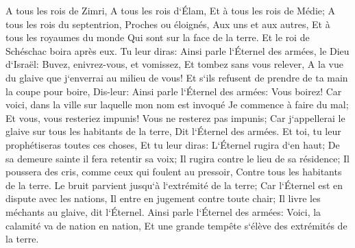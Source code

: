 \verse A tous les rois de Zimri, A tous les rois d`Élam, Et à tous les rois de Médie; 
\verse A tous les rois du septentrion, Proches ou éloignés, Aux uns et aux autres, Et à tous les royaumes du monde Qui sont sur la face de la terre. Et le roi de Schéschac boira après eux. 
\verse Tu leur diras: Ainsi parle l`Éternel des armées, le Dieu d`Israël: Buvez, enivrez-vous, et vomissez, Et tombez sans vous relever, A la vue du glaive que j`enverrai au milieu de vous! 
\verse Et s`ils refusent de prendre de ta main la coupe pour boire, Dis-leur: Ainsi parle l`Éternel des armées: Vous boirez! 
\verse Car voici, dans la ville sur laquelle mon nom est invoqué Je commence à faire du mal; Et vous, vous resteriez impunis! Vous ne resterez pas impunis; Car j`appellerai le glaive sur tous les habitants de la terre, Dit l`Éternel des armées. 
\verse Et toi, tu leur prophétiseras toutes ces choses, Et tu leur diras: L`Éternel rugira d`en haut; De sa demeure sainte il fera retentir sa voix; Il rugira contre le lieu de sa résidence; Il poussera des cris, comme ceux qui foulent au pressoir, Contre tous les habitants de la terre. 
\verse Le bruit parvient jusqu`à l`extrémité de la terre; Car l`Éternel est en dispute avec les nations, Il entre en jugement contre toute chair; Il livre les méchants au glaive, dit l`Éternel. 
\verse Ainsi parle l`Éternel des armées: Voici, la calamité va de nation en nation, Et une grande tempête s`élève des extrémités de la terre. 
